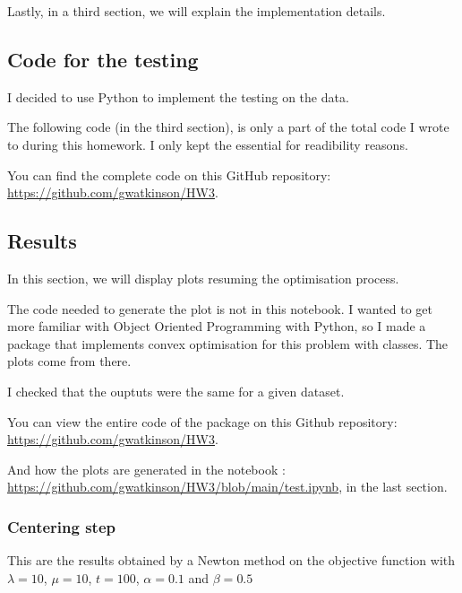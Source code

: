 \documentclass[11pt]{article}
\begin{document}
Lastly, in a third section, we will explain the implementation details.

    \hypertarget{code-for-the-testing}{%
\subsection{Code for the testing}\label{code-for-the-testing}}

I decided to use Python to implement the testing on the data.

The following code (in the third section), is only a part of the total
code I wrote to during this homework. I only kept the essential for
readibility reasons.

You can find the complete code on this GitHub repository:
\url{https://github.com/gwatkinson/HW3}.

    \hypertarget{results}{%
\subsection{Results}\label{results}}

In this section, we will display plots resuming the optimisation
process.

The code needed to generate the plot is not in this notebook. I wanted
to get more familiar with Object Oriented Programming with Python, so I
made a package that implements convex optimisation for this problem with
classes. The plots come from there.

I checked that the ouptuts were the same for a given dataset.

You can view the entire code of the package on this Github repository:
\href{https://github.com/gwatkinson/HW3/tree/main/src}{https://github.com/gwatkinson/HW3}.

And how the plots are generated in the notebook :
\href{test.ipynb}{https://github.com/gwatkinson/HW3/blob/main/test.ipynb},
in the last section.

    \hypertarget{centering-step}{%
\subsubsection{Centering step}\label{centering-step}}

This are the results obtained by a Newton method on the objective
function with \(\lambda=10\), \(\mu=10\), \(t=100\), \(\alpha=0.1\) and
\(\beta=0.5\)
\end{document}
